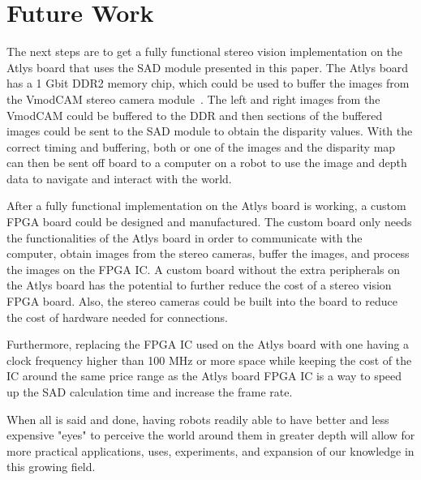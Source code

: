 \chapter{Future Work}

The next steps are to get a fully functional stereo vision implementation on the Atlys board that uses the SAD module presented in this paper. The Atlys board has a 1 Gbit DDR2 memory chip, which could be used to buffer the images from the VmodCAM stereo camera module~\cite{atlysBoard}. The left and right images from the VmodCAM could be buffered to the DDR and then sections of the buffered images could be sent to the SAD module to obtain the disparity values. With the correct timing and buffering, both or one of the images and the disparity map can then be sent off board to a computer on a robot to use the image and depth data to navigate and interact with the world.

After a fully functional implementation on the Atlys board is working, a custom FPGA board could be designed and manufactured. The custom board only needs the functionalities of the Atlys board in order to communicate with the computer, obtain images from the stereo cameras, buffer the images, and process the images on the FPGA IC. A custom board without the extra peripherals on the Atlys board has the potential to further reduce the cost of a stereo vision FPGA board. Also, the stereo cameras could be built into the board to reduce the cost of hardware needed for connections.

Furthermore, replacing the FPGA IC used on the Atlys board with one having a clock frequency higher than 100 MHz or more space while keeping the cost of the IC around the same price range as the Atlys board FPGA IC is a way to speed up the SAD calculation time and increase the frame rate.

When all is said and done, having robots readily able to have better and less expensive "eyes" to perceive the world around them in greater depth will allow for more practical applications, uses, experiments, and expansion of our knowledge in this growing field.
